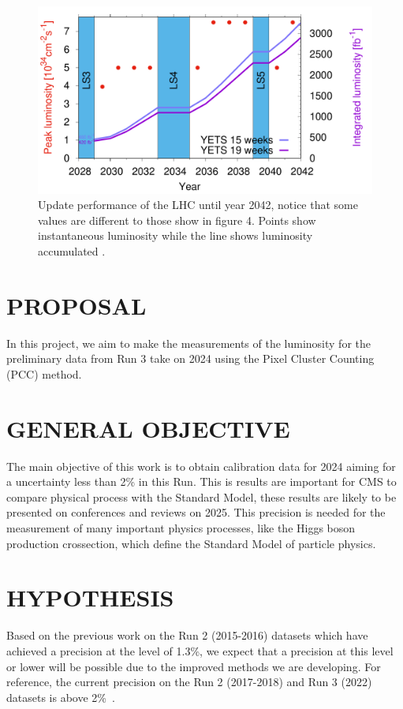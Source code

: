 \documentclass[final,12p]{article}
\begin{document}
\begin{figure}[H]
  \centering
  \includegraphics[width=0.8\columnwidth]{./upsche.png}
  \caption{
    Update performance of the LHC until year 2042, notice that some values are different to those show in figure 4. Points show instantaneous luminosity while the line shows luminosity accumulated \cite{collaborations2019report}.
  }
  \label{figure6}
\end{figure}


\section{PROPOSAL}

In this project, we aim to make the measurements of the luminosity for the preliminary data from Run 3 take on 2024 using the Pixel Cluster Counting (PCC) method. 

\section{GENERAL OBJECTIVE}


The main objective of this work is to obtain calibration data for 2024 aiming for a uncertainty less than 2\% in this Run. This is results are important for CMS to compare physical process with the Standard Model, these results are likely to be presented on conferences and reviews on 2025.
This precision is needed for the measurement of many important physics processes, like the Higgs boson production crossection, which define the Standard Model of particle physics. 

\section{HYPOTHESIS}


Based on the previous work on the Run 2 (2015-2016) datasets which have achieved a precision at the level of 1.3\%, we expect that a precision at this level or lower will be possible due to the improved methods we are developing.
For reference, the current precision on the Run 2 (2017-2018) and Run 3 (2022) datasets is above 2\%~\cite{Sirunyan:2021qkt}. 
\end{document}
